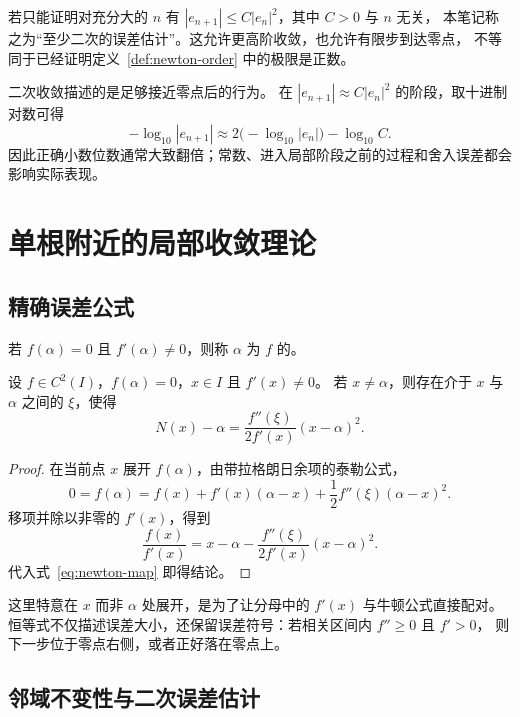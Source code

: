 \documentclass{ctexart}
\begin{document}
若只能证明对充分大的 $n$ 有 $|e_{n+1}|\le C|e_n|^2$，其中 $C>0$ 与 $n$ 无关，
本笔记称之为“至少二次的误差估计”。这允许更高阶收敛，也允许有限步到达零点，
不等同于已经证明定义~\ref{def:newton-order} 中的极限是正数。

二次收敛描述的是足够接近零点后的行为。
在 $|e_{n+1}|\approx C|e_n|^2$ 的阶段，取十进制对数可得
\[
  -\log_{10}|e_{n+1}|\approx2\bigl(-\log_{10}|e_n|\bigr)-\log_{10}C.
\]
因此正确小数位数通常大致翻倍；常数、进入局部阶段之前的过程和舍入误差都会影响实际表现。

\section{单根附近的局部收敛理论}
\label{sec:newton-local}

\subsection{精确误差公式}

\begin{definition}[单根]
若 $f(\alpha)=0$ 且 $f'(\alpha)\ne0$，则称 $\alpha$ 为 $f$ 的。
\end{definition}

\begin{lemma}[一步误差恒等式]\label{lem:newton-error}
设 $f\in C^2(I)$，$f(\alpha)=0$，$x\in I$ 且 $f'(x)\ne0$。
若 $x\ne\alpha$，则存在介于 $x$ 与 $\alpha$ 之间的 $\xi$，使得
\begin{equation}\label{eq:newton-exact-error}
  N(x)-\alpha=\frac{f''(\xi)}{2f'(x)}(x-\alpha)^2.
\end{equation}
\end{lemma}

\begin{proof}
在当前点 $x$ 展开 $f(\alpha)$，由带拉格朗日余项的泰勒公式，
\[
  0=f(\alpha)=f(x)+f'(x)(\alpha-x)
    +\frac12f''(\xi)(\alpha-x)^2.
\]
移项并除以非零的 $f'(x)$，得到
\[
  \frac{f(x)}{f'(x)}=x-\alpha-\frac{f''(\xi)}{2f'(x)}(x-\alpha)^2.
\]
代入式~\eqref{eq:newton-map} 即得结论。
\end{proof}

这里特意在 $x$ 而非 $\alpha$ 处展开，是为了让分母中的 $f'(x)$ 与牛顿公式直接配对。
恒等式不仅描述误差大小，还保留误差符号：若相关区间内 $f''\ge0$ 且 $f'>0$，
则下一步位于零点右侧，或者正好落在零点上。

\subsection{邻域不变性与二次误差估计}
\end{document}
